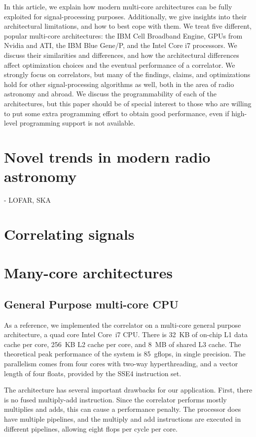 \documentclass{article}
\begin{document}
In this article, we explain how modern multi-core architectures can be fully
exploited for signal-processing purposes.
Additionally, we give insights into their architectural limitations, and how
to best cope with them.
We treat five different, popular multi-core architectures: the IBM Cell
Broadband Engine, GPUs from Nvidia and ATI, the IBM Blue Gene/P, and
the Intel Core i7 processors.
We discuss their similarities and differences, and how the architectural
differences affect optimization choices and the eventual performance of a
correlator.
We strongly focus on correlators, but many of the findings, claims, and
optimizations hold for other signal-processing algorithms as well, both in the
area of radio astronomy and abroad.
We discuss the programmability of each of the architectures, but this paper
should be of special interest to those who are willing to put some extra
programming effort to obtain good performance, even if high-level programming
support is not available.


\section{Novel trends in modern radio astronomy}
    - LOFAR, SKA

\section{Correlating signals}


\section{Many-core architectures}

\subsection{General Purpose multi-core CPU}

As a reference, we implemented the correlator on a multi-core general
purpose architecture, a quad core Intel Core~i7 CPU.  There is 32~KB
of on-chip L1 data cache per core, 256~KB L2 cache per core, and 8~MB
of shared L3 cache.  The theoretical peak performance of the system is
85~gflops, in single precision.  The parallelism comes from four cores
with two-way hyperthreading, and a vector length of four floats,
provided by the SSE4 instruction set.

The architecture has several important drawbacks for our application.
First, there is no fused multiply-add instruction.  Since the
correlator performs mostly multiplies and adds, this can cause a
performance penalty. The processor does have multiple pipelines, and
the multiply and add instructions are executed in different pipelines,
allowing eight flops per cycle per core.
\end{document}
